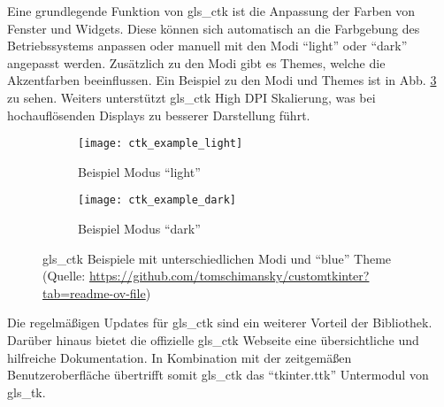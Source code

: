 Eine grundlegende Funktion von \gls{gls_ctk} ist die Anpassung der Farben von Fenster und Widgets. Diese können sich automatisch an die Farbgebung des Betriebssystems anpassen oder manuell mit den Modi \enquote{light} oder \enquote{dark} angepasst werden. Zusätzlich zu den Modi gibt es Themes, welche die Akzentfarben beeinflussen. Ein Beispiel zu den Modi und Themes ist in Abb. \ref{fig:ctk_bsp} zu sehen. Weiters unterstützt \gls{gls_ctk} High DPI Skalierung, was bei hochauflösenden Displays zu besserer Darstellung führt. \cite[vgl.][]{Schimansky_Git:o.J.}

\begin{figure}[H]
	\centering
	\begin{subfigure}[t]{0.90\textwidth}
		\centering
		\texttt{[image: ctk\_example\_light]}
		\caption{Beispiel Modus \enquote{light} \label{fig:ctk_light}}
	\end{subfigure}
	\begin{subfigure}[t]{0.90\textwidth}
		\centering
		\texttt{[image: ctk\_example\_dark]}
		\caption{Beispiel Modus \enquote{dark} \label{fig:ctk_dark}}
	\end{subfigure}
	\caption[\gls{gls_ctk} Beispiele mit unterschiedlichen Modi und \enquote{blue} Theme (Quelle: \url{https://github.com/tomschimansky/customtkinter?tab=readme-ov-file}, Zugriff am 25.02.2024)]{\gls{gls_ctk} Beispiele mit unterschiedlichen Modi und \enquote{blue} Theme  (Quelle: \url{https://github.com/tomschimansky/customtkinter?tab=readme-ov-file})    \label{fig:ctk_bsp}}
\end{figure}

Die regelmäßigen Updates für \gls{gls_ctk} sind ein weiterer Vorteil der Bibliothek. Darüber hinaus bietet die offizielle \gls{gls_ctk} Webseite eine übersichtliche und hilfreiche Dokumentation. In Kombination mit der zeitgemäßen Benutzeroberfläche übertrifft somit \gls{gls_ctk} das \enquote{tkinter.ttk} Untermodul von \gls{gls_tk}.


